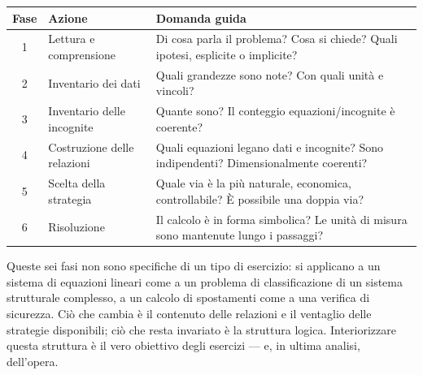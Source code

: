 \begin{center}
	\renewcommand{\arraystretch}{1.6}
	\begin{tabularx}{\linewidth}{c l X}
		\toprule
		\textbf{Fase} & \textbf{Azione} & \textbf{Domanda guida} \\
		\midrule
		1 & Lettura e comprensione    & Di cosa parla il problema? Cosa si chiede? Quali ipotesi, esplicite o implicite? \\
		2 & Inventario dei dati       & Quali grandezze sono note? Con quali unità e vincoli? \\
		3 & Inventario delle incognite & Quante sono? Il conteggio equazioni/incognite è coerente? \\
		4 & Costruzione delle relazioni & Quali equazioni legano dati e incognite? Sono indipendenti? Dimensionalmente coerenti? \\
		5 & Scelta della strategia    & Quale via è la più naturale, economica, controllabile? È possibile una doppia via? \\
		6 & Risoluzione               & Il calcolo è in forma simbolica? Le unità di misura sono mantenute lungo i passaggi? \\
		\bottomrule
	\end{tabularx}
\end{center}

\medskip

Queste sei fasi non sono specifiche di un tipo di esercizio: si applicano a un sistema di equazioni lineari come a un problema di classificazione di un sistema strutturale complesso, a un calcolo di spostamenti come a una verifica di sicurezza. Ciò che cambia è il contenuto delle relazioni e il ventaglio delle strategie disponibili; ciò che resta invariato è la struttura logica. Interiorizzare questa struttura è il vero obiettivo degli esercizi --- e, in ultima analisi, dell'opera.\
